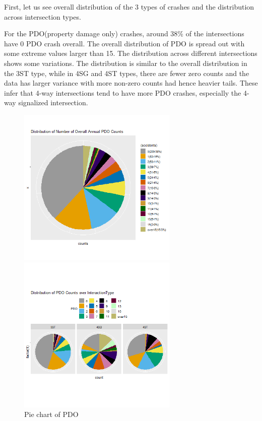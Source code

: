 \documentclass[11pt]{scrartcl} %
\begin{document}
First, let us see overall distribution of the 3 types of crashes and the distribution across intersection types.

For the PDO(property damage only) crashes, around 38\% of the intersections have 0 PDO crash overall. The overall distribution of PDO is spread out with some extreme values larger than 15. The distribution across different intersections shows some variations. The distribution is similar to the overall distribution in the 3ST type, while in 4SG and 4ST types, there are fewer zero counts and the data has larger variance with more non-zero counts had hence heavier tails. These infer that 4-way intersections tend to have more PDO crashes, especially the 4-way signalized intersection.

\begin{figure}[H]
\begin{minipage}[t]{0.5\linewidth}
\centering
\includegraphics[width=3in]{image/p111.png}
\small
\end{minipage}
\begin{minipage}[t]{0.5\linewidth}
\centering
\includegraphics[width=3in]{image/p121_PDO.png}
\small
\end{minipage}
\caption{Pie chart of PDO}
\end{figure}
\end{document}
